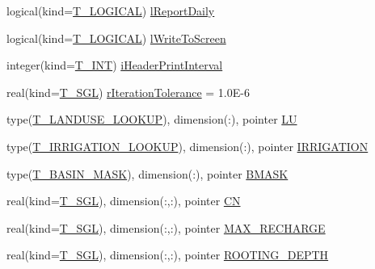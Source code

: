 \begin{DoxyCompactItemize}
\item 
logical(kind=\hyperlink{namespacetypes_adfa8f4f6096bb7bdbb93f36b911dcaad}{T\_\-LOGICAL}) \hyperlink{typetypes_1_1_t___m_o_d_e_l___c_o_n_f_i_g_u_r_a_t_i_o_n_a783c6237cb9a0d9dd443a04b4227a7c2}{lReportDaily}
\item 
logical(kind=\hyperlink{namespacetypes_adfa8f4f6096bb7bdbb93f36b911dcaad}{T\_\-LOGICAL}) \hyperlink{typetypes_1_1_t___m_o_d_e_l___c_o_n_f_i_g_u_r_a_t_i_o_n_a2898e9be8cf6fc32a7888d2fb998a0ae}{lWriteToScreen}
\item 
integer(kind=\hyperlink{namespacetypes_a4e4d040a4425196c4d43be63e7e6103a}{T\_\-INT}) \hyperlink{typetypes_1_1_t___m_o_d_e_l___c_o_n_f_i_g_u_r_a_t_i_o_n_adf2574a4ac13000a14c8e3d945afee8a}{iHeaderPrintInterval}
\item 
real(kind=\hyperlink{namespacetypes_af3012489af4c138f271f1bce244b7e51}{T\_\-SGL}) \hyperlink{typetypes_1_1_t___m_o_d_e_l___c_o_n_f_i_g_u_r_a_t_i_o_n_a24ed577563b666ba73bab0d5ca4ed90f}{rIterationTolerance} = 1.0E-\/6
\item 
type(\hyperlink{typetypes_1_1_t___l_a_n_d_u_s_e___l_o_o_k_u_p}{T\_\-LANDUSE\_\-LOOKUP}), dimension(:), pointer \hyperlink{typetypes_1_1_t___m_o_d_e_l___c_o_n_f_i_g_u_r_a_t_i_o_n_af0d8d8090bac1375c95ea5588e49abda}{LU}
\item 
type(\hyperlink{typetypes_1_1_t___i_r_r_i_g_a_t_i_o_n___l_o_o_k_u_p}{T\_\-IRRIGATION\_\-LOOKUP}), dimension(:), pointer \hyperlink{typetypes_1_1_t___m_o_d_e_l___c_o_n_f_i_g_u_r_a_t_i_o_n_a2d71884498a5e58ab71ca5a28dc4232e}{IRRIGATION}
\item 
type(\hyperlink{typetypes_1_1_t___b_a_s_i_n___m_a_s_k}{T\_\-BASIN\_\-MASK}), dimension(:), pointer \hyperlink{typetypes_1_1_t___m_o_d_e_l___c_o_n_f_i_g_u_r_a_t_i_o_n_a3cb15ee5ca40b3d75222b97deb0b740a}{BMASK}
\item 
real(kind=\hyperlink{namespacetypes_af3012489af4c138f271f1bce244b7e51}{T\_\-SGL}), dimension(:,:), pointer \hyperlink{typetypes_1_1_t___m_o_d_e_l___c_o_n_f_i_g_u_r_a_t_i_o_n_ae23f5600c8963f0a3c6a44d769390353}{CN}
\item 
real(kind=\hyperlink{namespacetypes_af3012489af4c138f271f1bce244b7e51}{T\_\-SGL}), dimension(:,:), pointer \hyperlink{typetypes_1_1_t___m_o_d_e_l___c_o_n_f_i_g_u_r_a_t_i_o_n_a935886bbd346d44b21915aa6cf776cf3}{MAX\_\-RECHARGE}
\item 
real(kind=\hyperlink{namespacetypes_af3012489af4c138f271f1bce244b7e51}{T\_\-SGL}), dimension(:,:), pointer \hyperlink{typetypes_1_1_t___m_o_d_e_l___c_o_n_f_i_g_u_r_a_t_i_o_n_a2947ed88af34c595e1dccf7370e16753}{ROOTING\_\-DEPTH}

\end{DoxyCompactItemize}
